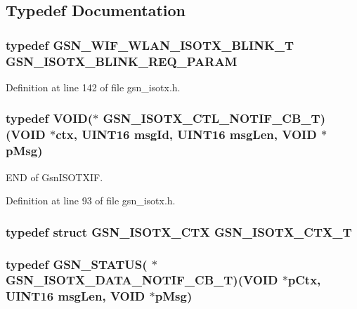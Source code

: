 \subsection{Typedef Documentation}
\hypertarget{a00520_a9ac94969b34cb75f0c095457d6efb945}{
\subsubsection[{GSN\_\-ISOTX\_\-BLINK\_\-REQ\_\-PARAM}]{\setlength{\rightskip}{0pt plus 5cm}typedef {\bf GSN\_\-WIF\_\-WLAN\_\-ISOTX\_\-BLINK\_\-T} {\bf GSN\_\-ISOTX\_\-BLINK\_\-REQ\_\-PARAM}}}
\label{a00520_a9ac94969b34cb75f0c095457d6efb945}


Definition at line 142 of file gsn\_\-isotx.h.

\hypertarget{a00520_a5fb480486e6585bd46bfcb3ad503bdd4}{
\subsubsection[{GSN\_\-ISOTX\_\-CTL\_\-NOTIF\_\-CB\_\-T}]{\setlength{\rightskip}{0pt plus 5cm}typedef VOID($\ast$ {\bf GSN\_\-ISOTX\_\-CTL\_\-NOTIF\_\-CB\_\-T})(VOID $\ast$ctx, {\bf UINT16} msgId, {\bf UINT16} msgLen, VOID $\ast$pMsg)}}
\label{a00520_a5fb480486e6585bd46bfcb3ad503bdd4}
END of GsnISOTXIF. 

Definition at line 93 of file gsn\_\-isotx.h.

\hypertarget{a00520_a7a3f270b271183e40e25c7967da7798a}{
\subsubsection[{GSN\_\-ISOTX\_\-CTX\_\-T}]{\setlength{\rightskip}{0pt plus 5cm}typedef struct {\bf GSN\_\-ISOTX\_\-CTX}  {\bf GSN\_\-ISOTX\_\-CTX\_\-T}}}
\label{a00520_a7a3f270b271183e40e25c7967da7798a}
\hypertarget{a00520_ae9071f19d1fb2c67ee3777a8e1306727}{
\subsubsection[{GSN\_\-ISOTX\_\-DATA\_\-NOTIF\_\-CB\_\-T}]{\setlength{\rightskip}{0pt plus 5cm}typedef {\bf GSN\_\-STATUS}( $\ast$ {\bf GSN\_\-ISOTX\_\-DATA\_\-NOTIF\_\-CB\_\-T})(VOID $\ast$pCtx, {\bf UINT16} msgLen, VOID $\ast$pMsg)}}
\label{a00520_ae9071f19d1fb2c67ee3777a8e1306727}


